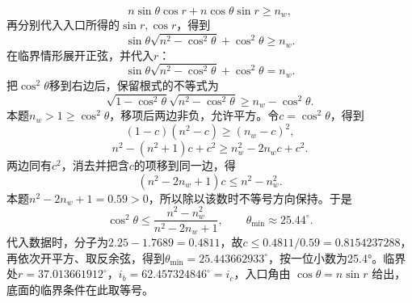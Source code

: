 \documentclass[UTF8,fontset=fandol,a4paper,11pt]{ctexart}
\begin{document}
\[
n\sin\theta\cos r+n\cos\theta\sin r\ge n_w,
\]
再分别代入入口所得的$\sin r,\cos r$，得到
\[
\sin\theta\sqrt{n^2-\cos^2\theta}+\cos^2\theta\ge n_w.
\]
在临界情形展开正弦，并代入$r$：
\[
\sin\theta\sqrt{n^2-\cos^2\theta}
+\cos^2\theta=n_w.
\]
把$\cos^2\theta$移到右边后，保留根式的不等式为
\[
\sqrt{1-\cos^2\theta}\sqrt{n^2-\cos^2\theta}
\ge n_w-\cos^2\theta.
\]
本题$n_w>1\ge\cos^2\theta$，移项后两边非负，允许平方。令$c=\cos^2\theta$，得到
\[
(1-c)(n^2-c)\ge(n_w-c)^2,
\]
\[
n^2-(n^2+1)c+c^2
\ge n_w^2-2n_wc+c^2.
\]
两边同有$c^2$，消去并把含$c$的项移到同一边，得
\[
(n^2-2n_w+1)c\le n^2-n_w^2.
\]
本题$n^2-2n_w+1=0.59>0$，所以除以该数时不等号方向保持。于是
\[
\boxed{\cos^2\theta\le
\frac{n^2-n_w^2}{n^2-2n_w+1}},\qquad
\boxed{\theta_{\min}\approx25.44^\circ}.
\]
代入数据时，分子为$2.25-1.7689=0.4811$，故$c\le0.4811/0.59=0.8154237288$，再依次开平方、取反余弦，得到$\theta_{\min}=25.443662933^\circ$，按一位小数为25.4°。临界处$r=37.013661912^\circ$，$i_b=62.457324846^\circ=i_c$，入口角由 $\cos\theta=n\sin r$ 给出，底面的临界条件在此取等号。
\end{document}
